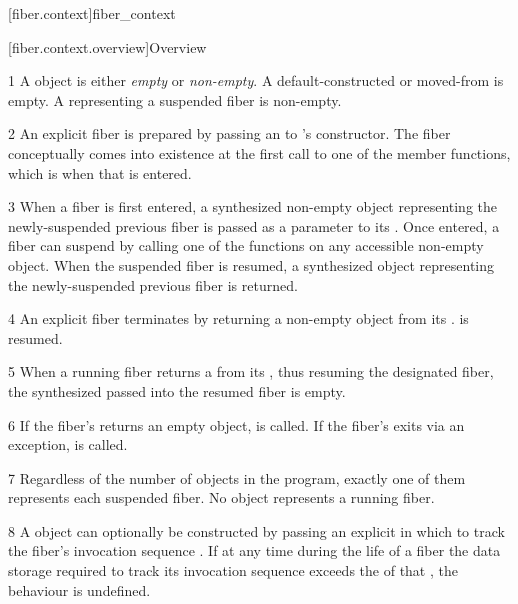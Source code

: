 \cbstart

[fiber.context]{fiber\_context}

[fiber.context.overview]{Overview}

1 A \fiber object is either \emph{empty} or \emph{non-empty}. A
default-constructed or moved-from \fiber is empty. A \fiber
representing a suspended fiber is non-empty.

2 An explicit fiber is prepared by passing an \emph{\entryfn} to \fiber's
constructor. The fiber conceptually comes into existence at the first call to
one of the \anyresume member functions, which is when that \entryfn is
entered.

3 When a fiber is first entered, a synthesized non-empty \fiber object
representing the newly-suspended previous fiber is passed as a parameter to
its \entryfn. Once entered, a fiber can suspend by calling one of the \anyresume
functions on any accessible non-empty \fiber object. When the
suspended fiber is resumed, a synthesized \fiber object
representing the newly-suspended previous fiber is returned.

4 An explicit fiber terminates by returning a non-empty \fiber object from
its \entryfn.  is resumed.



5 When a running fiber returns a \fiber from its \entryfn, thus resuming the
designated fiber, the synthesized \fiber passed into the resumed fiber is
empty.

6 If the fiber's \entryfn returns an empty \fiber object,  is called.
If the fiber's \entryfn exits via an exception,  is called.

7 Regardless of the number of \fiber objects in the program, exactly one of them
represents each suspended fiber. No \fiber object represents a running fiber.

8 A \fiber object can optionally be constructed by passing an explicit
 in which to track the fiber's invocation sequence
. If at any time during the life of a fiber the
data storage required to track its invocation sequence exceeds the
 of that , the behaviour is undefined.

